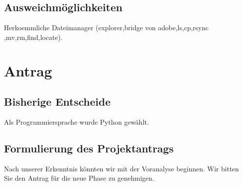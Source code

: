\documentclass[10pt,paper=a4,final]{scrartcl}
\begin{document}
\subsection{Ausweichm\"oglichkeiten}
Herkoemmliche Dateimanager (explorer,bridge von adobe,ls,cp,rsync
,mv,rm,find,locate).
\section{Antrag}
\subsection{Bisherige Entscheide}
Als Programmiersprache wurde Python gew\"ahlt.
\subsection{Formulierung des Projektantrags}
Nach unserer Erkenntnis könnten wir mit der Voranalyse beginnen. Wir bitten Sie den Antrag für die neue Phase zu genehmigen.
\end{document}
